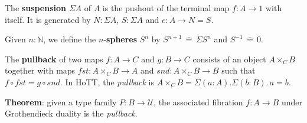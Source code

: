 \documentclass[a4paper]{article}
\begin{document}
The \textbf{suspension} $\Sigma A$ of $A$ is the pushout of the terminal map $f : A \to 1$ with itself. It is generated by $N : \Sigma A$, $S : \Sigma A$ and $e : A \to N = S$.

Given $n : \mathbb{N}$, we define the $n$-\textbf{spheres} $S^n$ by $S^{n+1} \, \hat{=} \, \Sigma S^n$ and $S^{-1} \, \hat{=} \, 0$.

The \textbf{pullback} of two maps $f : A \to C$ and $g : B \to C$ consists of an object $A \times_C B$ together with maps $\textit{fst} : A \times_C B \to A$ and $\textit{snd} : A \times_C B \to B$ such that $f \circ \textit{fst} = g \circ \textit{snd}$. In HoTT, the \textit{pullback} is $A \times_C B = \Sigma (a : A). \Sigma (b : B). \, a = b$.

\textbf{Theorem}: given a type family $P : B \to \mathcal{U}$, the associated fibration $f : A \to B$ under Grothendieck duality is the \textit{pullback}.
\end{document}
